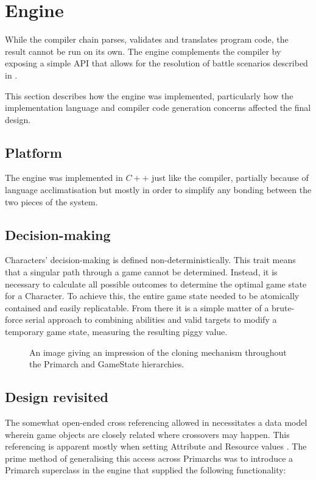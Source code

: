 \section{Engine}
While the \langname{} compiler chain parses, validates and translates program code, the result cannot be run on its own. The engine complements the compiler by exposing a simple API that allows for the resolution of battle scenarios described in \langname{}.

This section describes how the engine was implemented, particularly how the implementation language and compiler code generation concerns affected the final design.

\subsection{Platform}
The engine was implemented in $C++$ just like the compiler, partially because of language acclimatisation but mostly in order to simplify any bonding between the two pieces of the system. 

\subsection{Decision-making}
Characters' decision-making is defined non-deterministically. This trait means that a singular path through a game cannot be determined. Instead, it is necessary to calculate all possible outcomes to determine the optimal game state for a Character. To achieve this, the entire game state needed to be atomically contained and easily replicatable. From there it is a simple matter of a brute-force serial approach to combining abilities and valid targets to modify a temporary game state, measuring the resulting piggy value.

\begin{figure}
\caption{\label{figure:implementation:engine:cloning}An image giving an impression of the cloning mechanism throughout the Primarch and GameState hierarchies.}
\end{figure}

\subsection{Design revisited}
The somewhat open-ended cross referencing allowed in \langname{} necessitates a data model wherein game objects are closely related where crossovers may happen. This referencing is apparent mostly when setting Attribute and Resource values . The prime method of generalising this access across Primarchs was to introduce a Primarch superclass in the engine that supplied the following functionality:

